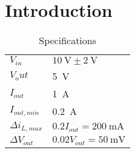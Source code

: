 \section{Introduction}

\begin{table}[h]
	\centering
	\caption{Specifications}
	\begin{tabular}{ll}
		\toprule
		$V_{in}$ & $\SI{10}{\volt}\pm\SI{2}{\volt}$\\
		$V_out$ & \SI{5}{\volt}\\
		$I_{out}$ & \SI{1}{\ampere}\\
		$I_{out,min}$ & \SI{0.2}{\ampere}\\
		$\Delta i_{L,max}$ & $0.2I_{out}=\SI{200}{\milli\ampere}$\\
		$\Delta V_{out}$ & $0.02V_{out}=\SI{50}{\milli\volt}$\\
		\bottomrule
	\end{tabular}
	\label{tab:specs}
\end{table}